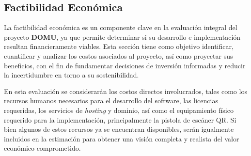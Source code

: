 \subsection{Factibilidad Económica}

La factibilidad económica es un componente clave en la evaluación integral del proyecto \textbf{DOMU}, ya que permite determinar si su desarrollo e implementación resultan financieramente viables. Esta sección tiene como objetivo identificar, cuantificar y analizar los costos asociados al proyecto, así como proyectar sus beneficios, con el fin de fundamentar decisiones de inversión informadas y reducir la incertidumbre en torno a su sostenibilidad.

En esta evaluación se considerarán los costos directos involucrados, tales como los recursos humanos necesarios para el desarrollo del software, las licencias requeridas, los servicios de \textit{hosting} y dominio, así como el equipamiento físico requerido para la implementación, principalmente la pistola de escáner QR. Si bien algunos de estos recursos ya se encuentran disponibles, serán igualmente incluidos en la estimación para obtener una visión completa y realista del valor económico comprometido.

